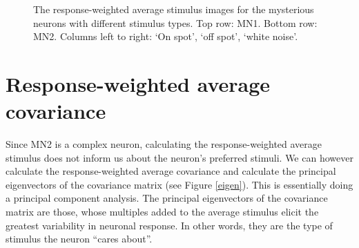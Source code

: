 \documentclass{scrartcl}
\begin{document}
\begin{figure}
\caption{The response-weighted average stimulus images for the mysterious neurons with different stimulus types. Top row: MN1. Bottom row: MN2. Columns left to right: `On spot', `off spot', `white noise'.}
\label{avestim}
\end{figure}

\section{Response-weighted average covariance}

Since MN2 is a complex neuron, calculating the response-weighted average stimulus does not inform us about the neuron's preferred stimuli. We can however calculate the response-weighted average covariance and calculate the principal eigenvectors of the covariance matrix (see Figure \ref{eigen}). This is essentially doing a principal component analysis. The principal eigenvectors of the covariance matrix are those, whose multiples added to the average stimulus elicit the greatest variability in neuronal response. In other words, they are the type of stimulus the neuron ``cares about''.
\end{document}
